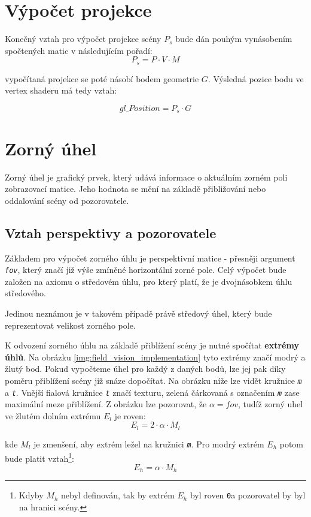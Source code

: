 \section{Výpočet projekce}
Konečný  vztah pro výpočet projekce scény $P_{s}$ bude dán pouhým vynásobením spočtených matic v následujícím pořadí:
$$ P_{s} = P \cdot V \cdot M  $$

 
vypočítaná projekce se poté násobí bodem geometrie $G$. Výsledná pozice bodu ve vertex shaderu má tedy   vztah:

$$ gl\_Position  = P_{s} \cdot G$$

\newpage

\section{Zorný úhel}
Zorný úhel je grafický prvek, který udává informace o aktuálním zorném poli zobrazovací matice. Jeho hodnota se mění na základě přibližování nebo oddalování scény od pozorovatele. 


\subsection{Vztah perspektivy a pozorovatele}
Základem pro výpočet zorného úhlu je perspektivní matice - přesněji argument \texttt{\textit{fov}}, který značí již výše zmíněné horizontální zorné pole. Celý výpočet bude  založen na axiomu o středovém úhlu, pro který platí, že je dvojnásobkem úhlu středového.\cite{planimetrie} 

Jedinou neznámou je v takovém případě právě středový úhel, který bude reprezentovat velikost zorného pole.

K odvození zorného úhlu na základě přiblížení scény je nutné spočítat \textbf{extrémy úhlů}. Na obrázku \ref{img:field_vision_implementation} tyto extrémy značí modrý a žlutý bod. Pokud vypočteme úhel pro každý z daných bodů, lze jej pak díky poměru přiblížení scény již snáze dopočítat. Na obrázku níže lze vidět kružnice \texttt{\textit{m}} a \texttt{\textit{t}}. Vnější fialová kružnice \texttt{\textit{t}} značí texturu, zelená čárkovaná  s označením \texttt{\textit{m}} zase maximální meze přiblížení. Z obrázku lze pozorovat, že $ \alpha = fov$, tudíž zorný uhel ve žlutém dolním extrému $E_{l}$ je roven: $$ E_{l} = 2 \cdot \alpha \cdot M_{l} $$

kde $M_{l}$ je zmenšení, aby extrém ležel na kružnici \texttt{\textit{m}}. Pro modrý extrém $E_{h}$ potom bude platit vztah\footnote{Kdyby $M_{h}$ nebyl definován, tak by extrém $E_{h}$ byl roven \texttt{0}\degree a pozorovatel by byl na hranici scény.}: $$ E_{h} = \alpha \cdot M_{h} $$


